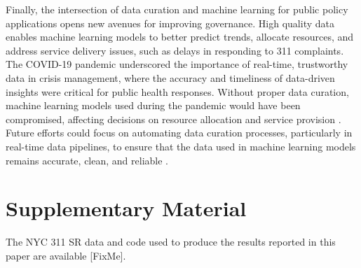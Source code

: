 \documentclass[linenumber]{jdsart}
\begin{document}
Finally, the intersection of data curation and machine learning for
public policy applications opens new avenues for improving governance.
High quality data enables machine learning models to better predict
trends, allocate resources, and address service delivery issues, such
as delays in responding to 311 complaints. The COVID\mbox{-}19 pandemic
underscored the importance of real\mbox{-}time, trustworthy data in crisis
management, where the accuracy and timeliness of data\mbox{-}driven insights
were critical for public health responses. Without proper data
curation, machine learning models used during the pandemic would have
been compromised, affecting decisions on resource allocation and
service provision \citep{worby2020face, khemasuwan2021applications}.
Future efforts could focus on automating data curation processes,
particularly in real\mbox{-}time data pipelines, to ensure that the data used
in machine learning models remains accurate, clean, and reliable
\citep{chu2016data, hurbean2021open}.


\section*{Supplementary Material}
The NYC 311 SR data and code used to produce the results reported in
this paper are available [FixMe].




\end{document}
